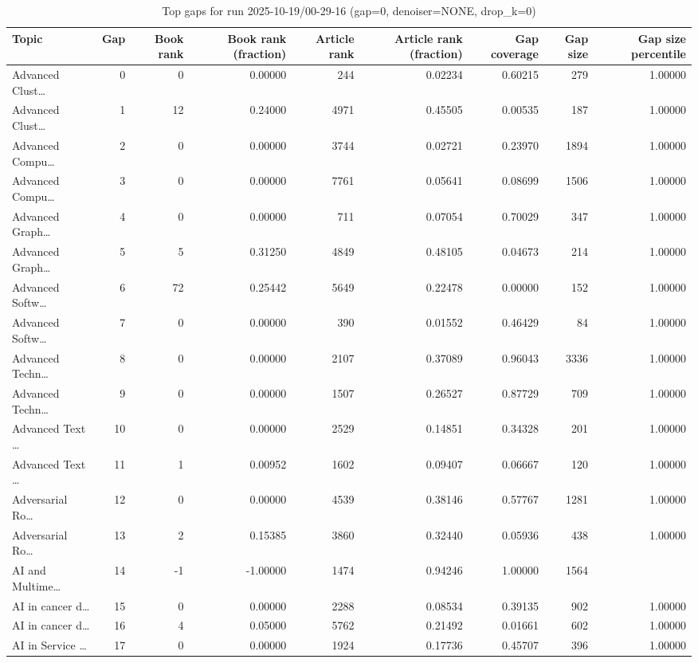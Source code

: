 \begin{table}
\caption{Top gaps for run 2025-10-19/00-29-16 (gap=0, denoiser=NONE, drop\_k=0)}
\label{tab:best_run_gap0_2025_10_19_00_29_16}
\begin{tabular}{lrrrrrrrr}
\toprule
Topic & Gap & Book rank & Book rank (fraction) & Article rank & Article rank (fraction) & Gap coverage & Gap size & Gap size percentile \\
\midrule
Advanced Clust… & 0 & 0 & 0.00000 & 244 & 0.02234 & 0.60215 & 279 & 1.00000 \\
Advanced Clust… & 1 & 12 & 0.24000 & 4971 & 0.45505 & 0.00535 & 187 & 1.00000 \\
Advanced Compu… & 2 & 0 & 0.00000 & 3744 & 0.02721 & 0.23970 & 1894 & 1.00000 \\
Advanced Compu… & 3 & 0 & 0.00000 & 7761 & 0.05641 & 0.08699 & 1506 & 1.00000 \\
Advanced Graph… & 4 & 0 & 0.00000 & 711 & 0.07054 & 0.70029 & 347 & 1.00000 \\
Advanced Graph… & 5 & 5 & 0.31250 & 4849 & 0.48105 & 0.04673 & 214 & 1.00000 \\
Advanced Softw… & 6 & 72 & 0.25442 & 5649 & 0.22478 & 0.00000 & 152 & 1.00000 \\
Advanced Softw… & 7 & 0 & 0.00000 & 390 & 0.01552 & 0.46429 & 84 & 1.00000 \\
Advanced Techn… & 8 & 0 & 0.00000 & 2107 & 0.37089 & 0.96043 & 3336 & 1.00000 \\
Advanced Techn… & 9 & 0 & 0.00000 & 1507 & 0.26527 & 0.87729 & 709 & 1.00000 \\
Advanced Text … & 10 & 0 & 0.00000 & 2529 & 0.14851 & 0.34328 & 201 & 1.00000 \\
Advanced Text … & 11 & 1 & 0.00952 & 1602 & 0.09407 & 0.06667 & 120 & 1.00000 \\
Adversarial Ro… & 12 & 0 & 0.00000 & 4539 & 0.38146 & 0.57767 & 1281 & 1.00000 \\
Adversarial Ro… & 13 & 2 & 0.15385 & 3860 & 0.32440 & 0.05936 & 438 & 1.00000 \\
AI and Multime… & 14 & -1 & -1.00000 & 1474 & 0.94246 & 1.00000 & 1564 &  \\
AI in cancer d… & 15 & 0 & 0.00000 & 2288 & 0.08534 & 0.39135 & 902 & 1.00000 \\
AI in cancer d… & 16 & 4 & 0.05000 & 5762 & 0.21492 & 0.01661 & 602 & 1.00000 \\
AI in Service … & 17 & 0 & 0.00000 & 1924 & 0.17736 & 0.45707 & 396 & 1.00000 \\

\end{tabular}
\end{table}
